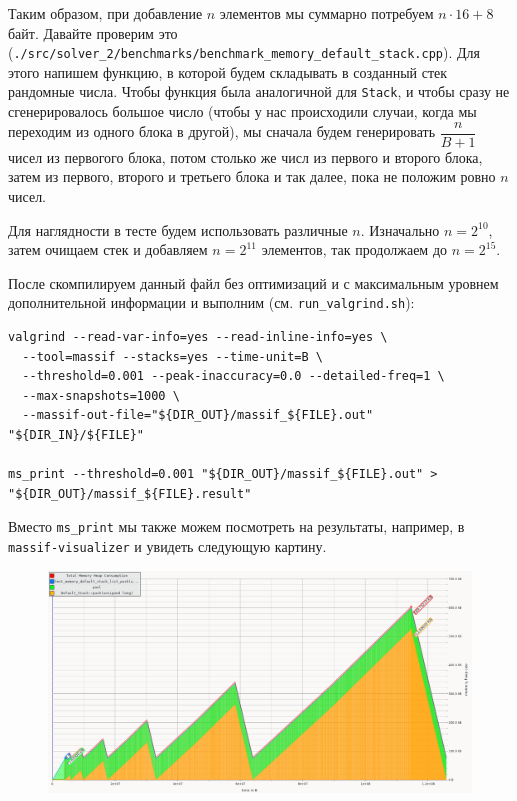 Таким образом, при добавление \(n\) элементов мы суммарно потребуем \(n\cdot 16 + 8\) байт. Давайте проверим это (\texttt{./src/solver_2/benchmarks/benchmark_memory_default_stack.cpp}). Для этого напишем функцию, в которой будем складывать в созданный стек рандомные числа. Чтобы функция была аналогичной для \texttt{Stack}, и чтобы сразу не сгенерировалось большое число (чтобы у нас происходили случаи, когда мы переходим из одного блока в другой), мы сначала будем генерировать \(\dfrac{n}{B + 1}\) чисел из первогого блока, потом столько же числ из первого и второго блока, затем из первого, второго и третьего блока и так далее, пока не положим ровно \(n\) чисел. 

Для наглядности в тесте будем использовать различные \(n\). Изначально \(n = 2^{10}\), затем очищаем стек и добавляем \(n = 2^{11}\) элементов, так продолжаем до \(n = 2^{15}\).

После скомпилируем данный файл без оптимизаций и с максимальным уровнем дополнительной информации и выполним (см. \texttt{run_valgrind.sh}):
\begin{verbatim}
valgrind --read-var-info=yes --read-inline-info=yes \
  --tool=massif --stacks=yes --time-unit=B \
  --threshold=0.001 --peak-inaccuracy=0.0 --detailed-freq=1 \
  --max-snapshots=1000 \
  --massif-out-file="${DIR_OUT}/massif_${FILE}.out" "${DIR_IN}/${FILE}" 

ms_print --threshold=0.001 "${DIR_OUT}/massif_${FILE}.out" > "${DIR_OUT}/massif_${FILE}.result"
\end{verbatim}

Вместо \texttt{ms_print} мы также можем посмотреть на результаты, например, в \texttt{massif-visualizer} и увидеть следующую картину.

\begin{figure}[H]
  \centering
  \includegraphics[width=1.0\textwidth]{../../resources/memory_consumption_of_solver_2_benchmark_memory_default_stack.png}
  \caption{}
\end{figure}

